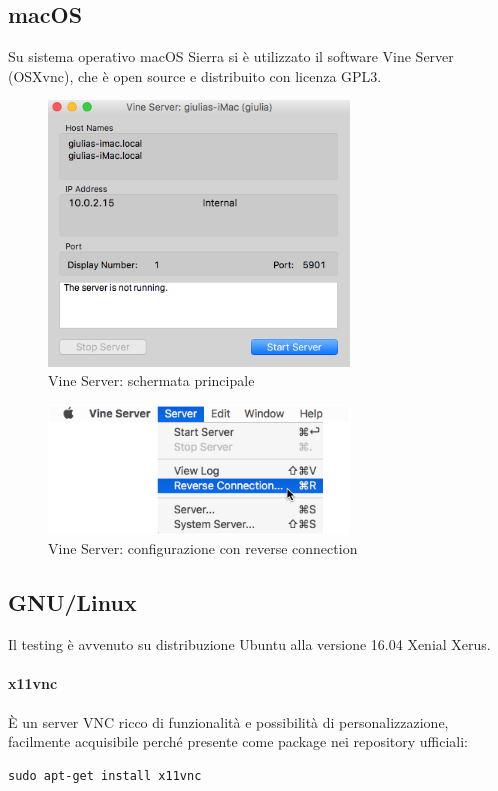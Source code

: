 \subsection{macOS}
Su sistema operativo macOS Sierra si è utilizzato il software Vine Server (OSXvnc), che è open source e distribuito con licenza GPL3.

\begin{figure}[h!]
\includegraphics[width=8cm]{../img/vine1}
\centering
\caption{Vine Server: schermata principale}
\end{figure}

\begin{figure}[h!]
\includegraphics[width=8cm]{../img/vine2}
\centering
\caption{Vine Server: configurazione con reverse connection}
\end{figure}

\subsection{GNU/Linux}
Il testing è avvenuto su distribuzione Ubuntu alla versione 16.04 Xenial Xerus.

\paragraph*{x11vnc}
\noindent È un server VNC ricco di funzionalità e possibilità di personalizzazione, facilmente acquisibile perché presente come package nei repository ufficiali:
\begin{lstlisting}
sudo apt-get install x11vnc
\end{lstlisting}

